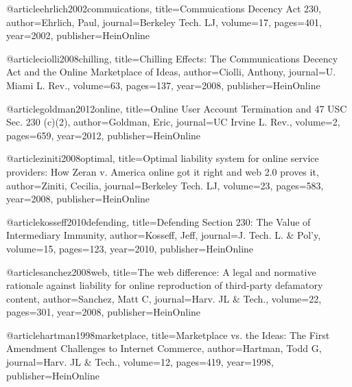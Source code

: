 






@article{ehrlich2002commuications,
  title={Commuications Decency Act 230},
  author={Ehrlich, Paul},
  journal={Berkeley Tech. LJ},
  volume={17},
  pages={401},
  year={2002},
  publisher={HeinOnline}
}

@article{ciolli2008chilling,
  title={Chilling Effects: The Communications Decency Act and the Online Marketplace of Ideas},
  author={Ciolli, Anthony},
  journal={U. Miami L. Rev.},
  volume={63},
  pages={137},
  year={2008},
  publisher={HeinOnline}
}

@article{goldman2012online,
  title={Online User Account Termination and 47 USC Sec. 230 (c)(2)},
  author={Goldman, Eric},
  journal={UC Irvine L. Rev.},
  volume={2},
  pages={659},
  year={2012},
  publisher={HeinOnline}
}

@article{ziniti2008optimal,
  title={Optimal liability system for online service providers: How Zeran v. America online got it right and web 2.0 proves it},
  author={Ziniti, Cecilia},
  journal={Berkeley Tech. LJ},
  volume={23},
  pages={583},
  year={2008},
  publisher={HeinOnline}
}

@article{kosseff2010defending,
  title={Defending Section 230: The Value of Intermediary Immunity},
  author={Kosseff, Jeff},
  journal={J. Tech. L. \& Pol'y},
  volume={15},
  pages={123},
  year={2010},
  publisher={HeinOnline}
}

@article{sanchez2008web,
  title={The web difference: A legal and normative rationale against liability for online reproduction of third-party defamatory content},
  author={Sanchez, Matt C},
  journal={Harv. JL \& Tech.},
  volume={22},
  pages={301},
  year={2008},
  publisher={HeinOnline}
}



@article{hartman1998marketplace,
  title={Marketplace vs. the Ideas: The First Amendment Challenges to Internet Commerce},
  author={Hartman, Todd G},
  journal={Harv. JL \& Tech.},
  volume={12},
  pages={419},
  year={1998},
  publisher={HeinOnline}
}

